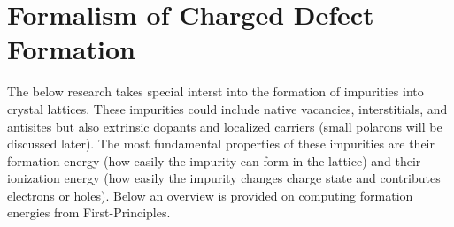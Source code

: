 \section{Formalism of Charged Defect Formation}

The below research takes special interst into the formation of impurities into crystal lattices. These impurities could include native vacancies, interstitials, and antisites but also extrinsic dopants and localized carriers (small polarons will be discussed later).
The most fundamental properties of these impurities are their formation energy (how easily the impurity can form in the lattice) and their ionization energy (how easily the impurity changes charge state and contributes electrons or holes).
Below an overview is provided on computing formation energies from First-Principles.

